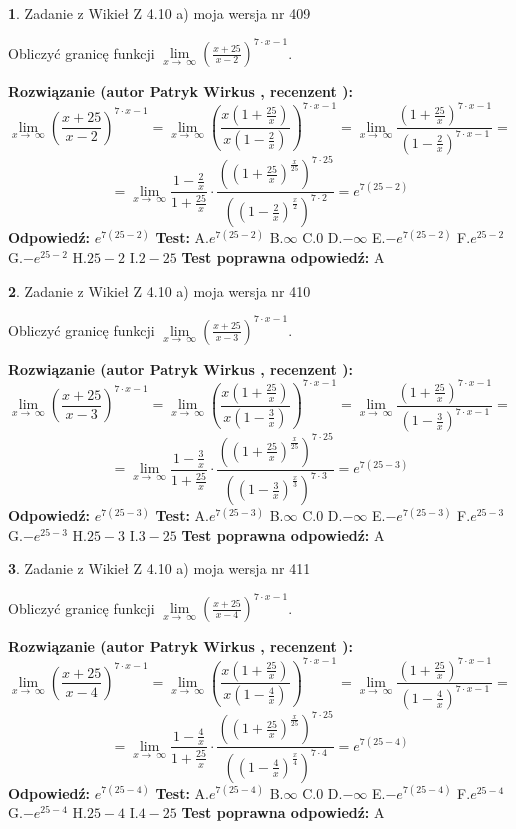 \documentclass[12pt, a4paper]{article}
\theoremstyle{definition} %
\newtheorem{zad}{}
\newcommand{\zadStart}[1]{\begin{zad}#1\newline}
\newcommand{\zadStop}{\end{zad}}
\newcommand{\rozwStart}[2]{\noindent \textbf{Rozwiązanie (autor #1 , recenzent #2): }\newline}
\newcommand{\rozwStop}{\newline}
\newcommand{\odpStart}{\noindent \textbf{Odpowiedź:}\newline}
\newcommand{\odpStop}{\newline}
\newcommand{\testStart}{\noindent \textbf{Test:}\newline}
\newcommand{\testStop}{\newline}
\newcommand{\kluczStart}{\noindent \textbf{Test poprawna odpowiedź:}\newline}
\newcommand{\kluczStop}{\newline}
\begin{document}
\zadStart{Zadanie z Wikieł Z 4.10 a) moja wersja nr 409}


Obliczyć granicę funkcji  $\lim\limits_{x\to\ \infty}(\frac{x+25}{x-2})^{7\cdot x-1}$.
\zadStop
\rozwStart{Patryk Wirkus}{}
$$\lim\limits_{x\to\ \infty}(\frac{x+25}{x-2})^{7\cdot x-1} = \lim\limits_{x\to\ \infty}(\frac{x(1+\frac{25}{x})}{x(1-\frac{2}{x})})^{7\cdot x-1}=\lim\limits_{x\to\ \infty}\frac{(1+\frac{25}{x})^{7\cdot x-1}}{(1-\frac{2}{x})^{7\cdot x-1}}=$$
$$=\lim\limits_{x\to\ \infty}\frac{1-\frac{2}{x}}{1+\frac{25}{x}}\cdot\frac{((1+\frac{25}{x})^{\frac{x}{25}})^{7\cdot25}}{((1-\frac{2}{x})^{\frac{x}{2}})^{7\cdot2}}=e^{7(25-2)}$$
\rozwStop
\odpStart
$e^{7(25-2)}$
\odpStop
\testStart
A.$e^{7(25-2)}$ B.$\infty$ C.$0$ D.$-\infty$ E.$-e^{7(25-2)}$
F.$e^{25-2}$ G.$-e^{25-2}$
H.$25-2$
I.$2-25$
\testStop
\kluczStart
A
\kluczStop



\zadStart{Zadanie z Wikieł Z 4.10 a) moja wersja nr 410}


Obliczyć granicę funkcji  $\lim\limits_{x\to\ \infty}(\frac{x+25}{x-3})^{7\cdot x-1}$.
\zadStop
\rozwStart{Patryk Wirkus}{}
$$\lim\limits_{x\to\ \infty}(\frac{x+25}{x-3})^{7\cdot x-1} = \lim\limits_{x\to\ \infty}(\frac{x(1+\frac{25}{x})}{x(1-\frac{3}{x})})^{7\cdot x-1}=\lim\limits_{x\to\ \infty}\frac{(1+\frac{25}{x})^{7\cdot x-1}}{(1-\frac{3}{x})^{7\cdot x-1}}=$$
$$=\lim\limits_{x\to\ \infty}\frac{1-\frac{3}{x}}{1+\frac{25}{x}}\cdot\frac{((1+\frac{25}{x})^{\frac{x}{25}})^{7\cdot25}}{((1-\frac{3}{x})^{\frac{x}{3}})^{7\cdot3}}=e^{7(25-3)}$$
\rozwStop
\odpStart
$e^{7(25-3)}$
\odpStop
\testStart
A.$e^{7(25-3)}$ B.$\infty$ C.$0$ D.$-\infty$ E.$-e^{7(25-3)}$
F.$e^{25-3}$ G.$-e^{25-3}$
H.$25-3$
I.$3-25$
\testStop
\kluczStart
A
\kluczStop



\zadStart{Zadanie z Wikieł Z 4.10 a) moja wersja nr 411}


Obliczyć granicę funkcji  $\lim\limits_{x\to\ \infty}(\frac{x+25}{x-4})^{7\cdot x-1}$.
\zadStop
\rozwStart{Patryk Wirkus}{}
$$\lim\limits_{x\to\ \infty}(\frac{x+25}{x-4})^{7\cdot x-1} = \lim\limits_{x\to\ \infty}(\frac{x(1+\frac{25}{x})}{x(1-\frac{4}{x})})^{7\cdot x-1}=\lim\limits_{x\to\ \infty}\frac{(1+\frac{25}{x})^{7\cdot x-1}}{(1-\frac{4}{x})^{7\cdot x-1}}=$$
$$=\lim\limits_{x\to\ \infty}\frac{1-\frac{4}{x}}{1+\frac{25}{x}}\cdot\frac{((1+\frac{25}{x})^{\frac{x}{25}})^{7\cdot25}}{((1-\frac{4}{x})^{\frac{x}{4}})^{7\cdot4}}=e^{7(25-4)}$$
\rozwStop
\odpStart
$e^{7(25-4)}$
\odpStop
\testStart
A.$e^{7(25-4)}$ B.$\infty$ C.$0$ D.$-\infty$ E.$-e^{7(25-4)}$
F.$e^{25-4}$ G.$-e^{25-4}$
H.$25-4$
I.$4-25$
\testStop
\kluczStart
A
\kluczStop
\end{document}
